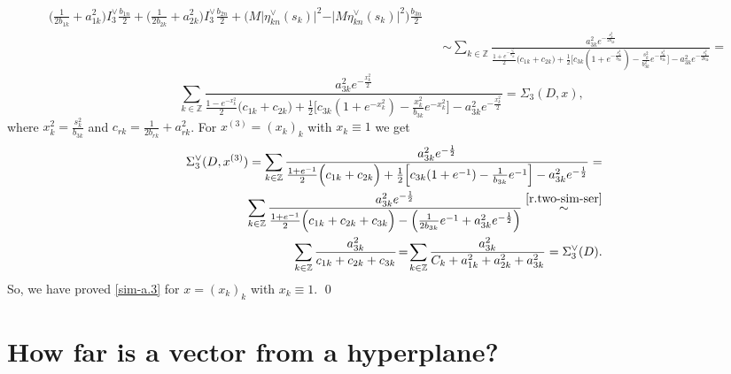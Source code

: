 \documentclass[preprint,12pt]{elsarticle}
\numberwithin{equation}{section}
\begin{document}
\begin{pf}
\begin{eqnarray}
{}
{\Big(\frac{1}{2b_{1k}}+a^2_{1k}\Big)I^{\vee}_3\frac{b_{1n}}{2}+
\Big(\frac{1}{2b_{2k}}+a^2_{2k}\Big)I^{\vee}_3\frac{b_{2n}}{2}+
 \Big(M\vert\eta^{\vee}_{kn}(s_k)\vert^2-\vert M\eta^{\vee}_{kn}(s_k)\vert^2\Big)\frac{b_{3n}}{2}}\\
 \nonumber
 &&
\sim\sum_{k\in \mathbb Z}\frac{
a^2_{3k}
e^{-\frac{s_k^2}{2b_{3k}}}
}
{
\frac{1+e^{-\frac{s^2_k}{b_{3k}}}}{2}\Big(c_{1k}+c_{2k}\Big)+
\frac{1}{2}\Big[
c_{3k}(1+e^{-\frac{s^2_k}{b_{3k}}})-
\frac{s^2_k}{b_{3k}^2}e^{-\frac{s^2_k}{b_{3k}}}\Big]-
a^2_{3k}
e^{-\frac{s^2_k}{2b_{3k}}}
 }=
\end{eqnarray}
\begin{equation} 
\label{D^v(3.x)}  
\sum_{k\in \mathbb Z}\frac{
a^2_{3k}
e^{-\frac{x_k^2}{2}}
}
{
\frac{1-e^{-x^2_k}
}{2}\Big(c_{1k}\!+\!c_{2k}\Big)\!+\!
\frac{1}{2}\Big[
c_{3k}(1+e^{-x^2_k})-
\frac{x^2_k}{b_{3k}}e^{-x_k^2
}\Big]\!-\!
a^2_{3k}
e^{-\frac{x^2_k}{2}}
 }\!=\!\Sigma_3(D,x),\quad
\end{equation}
where $x^2_k=\frac{s^2_k}{b_{3k}}$ and $c_{rk}=\frac{1}{2b_{rk}}+a^2_{rk}$. For $x^{(3)}=(x_k)_k$
with $x_k\equiv 1$ we get
\begin{eqnarray}
\nonumber 
&&
\Sigma^{\vee}_3(D,x^{(3)})=
\sum_{k\in \mathbb Z}\frac{
a^2_{3k}
e^{-\frac{1}{2}}
}
{
\frac{1+e^{-1}
}{2}\Big(c_{1k}+c_{2k}\Big)+
\frac{1}{2}\Big[
c_{3k}(1+e^{-1})-
\frac{1}{b_{3k}}e^{-1
}\Big]-
a^2_{3k}
e^{-\frac{1}{2}}}=\\
\nonumber
&&
\sum_{k\in \mathbb Z}\frac{
a^2_{3k}
e^{-\frac{1}{2}}
}
{
\frac{1+e^{-1}
}{2}\Big(c_{1k}+c_{2k}+c_{3k}\Big)-
\Big(
\frac{1}{2b_{3k}}e^{-1}+a^2_{3k}e^{-\frac{1}{2}}\Big)
}
%
\stackrel{\eqref{r.two-sim-ser}}{\sim}\\
\label{D^v_3} 
&&
\sum_{k\in \mathbb Z}\frac{
a^2_{3k}
}
{c_{1k}+c_{2k}+c_{3k}}\!=\!
\sum_{k\in \mathbb Z}\frac{
a^2_{3k}
}
{C_k+
a^2_{1k}+a^2_{2k}+a^2_{3k}}=
\Sigma^{\vee}_3(D).
\end{eqnarray}
So, we have proved \eqref{sim-a.3}
for $x=(x_k)_k$
with $x_k\equiv 1$. 
%
\qed\end{pf}

\section{How far is a vector from a hyperplane?}
\end{document}
